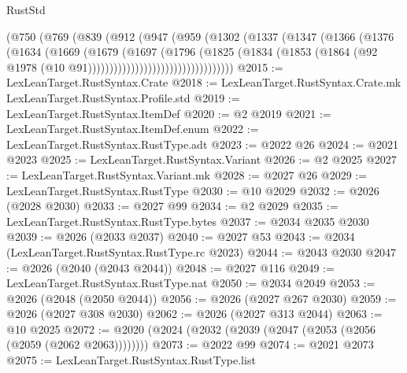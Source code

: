 \begin{lexlean}{RustStd}
\begin{coremodule}
                            (@750
                              (@769
                                (@839
                                  (@912
                                    (@947
                                      (@959
                                        (@1302
                                          (@1337
                                            (@1347
                                              (@1366
                                                (@1376
                                                  (@1634
                                                    (@1669
                                                      (@1679
                                                        (@1697
                                                          (@1796
                                                            (@1825
                                                              (@1834
                                                                (@1853
                                                                  (@1864
                                                                    (@92
                                                                      @1978
                                                                      (@10
                                                                        @91))))))))))))))))))))))))))))))))))
@2015 := LexLeanTarget.RustSyntax.Crate
@2018 := LexLeanTarget.RustSyntax.Crate.mk LexLeanTarget.RustSyntax.Profile.std
@2019 := LexLeanTarget.RustSyntax.ItemDef
@2020 := @2 @2019
@2021 := LexLeanTarget.RustSyntax.ItemDef.enum
@2022 := LexLeanTarget.RustSyntax.RustType.adt
@2023 := @2022 @26
@2024 := @2021 @2023
@2025 := LexLeanTarget.RustSyntax.Variant
@2026 := @2 @2025
@2027 := LexLeanTarget.RustSyntax.Variant.mk
@2028 := @2027 @26
@2029 := LexLeanTarget.RustSyntax.RustType
@2030 := @10 @2029
@2032 := @2026 (@2028 @2030)
@2033 := @2027 @99
@2034 := @2 @2029
@2035 := LexLeanTarget.RustSyntax.RustType.bytes
@2037 := @2034 @2035 @2030
@2039 := @2026 (@2033 @2037)
@2040 := @2027 @53
@2043 := @2034 (LexLeanTarget.RustSyntax.RustType.rc @2023)
@2044 := @2043 @2030
@2047 := @2026 (@2040 (@2043 @2044))
@2048 := @2027 @116
@2049 := LexLeanTarget.RustSyntax.RustType.nat
@2050 := @2034 @2049
@2053 := @2026 (@2048 (@2050 @2044))
@2056 := @2026 (@2027 @267 @2030)
@2059 := @2026 (@2027 @308 @2030)
@2062 := @2026 (@2027 @313 @2044)
@2063 := @10 @2025
@2072 := @2020 (@2024 (@2032 (@2039 (@2047 (@2053 (@2056 (@2059 (@2062 @2063))))))))
@2073 := @2022 @99
@2074 := @2021 @2073
@2075 := LexLeanTarget.RustSyntax.RustType.list

\end{coremodule}
\end{lexlean}
